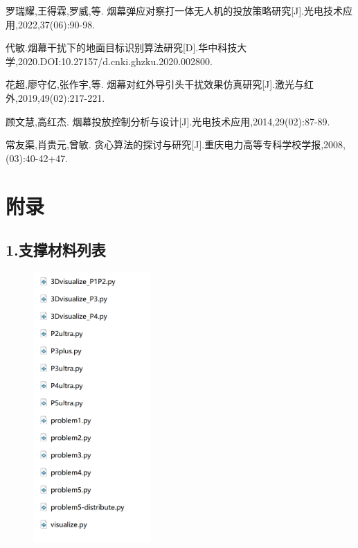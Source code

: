 \documentclass[12pt]{article}
\begin{document}
\begin{CJK}{UTF8}{gbsn}
		
		
		\newpage
		
		
		\begin{thebibliography}{99}
			

			 罗瑞耀,王得霖,罗威,等. 烟幕弹应对察打一体无人机的投放策略研究[J].光电技术应用,2022,37(06):90-98.
			
			 代敏.烟幕干扰下的地面目标识别算法研究[D].华中科技大学,2020.DOI:10.27157/d.cnki.ghzku.2020.002800.
			
			花超,廖守亿,张作宇,等. 烟幕对红外导引头干扰效果仿真研究[J].激光与红外,2019,49(02):217-221.

			顾文慧,高红杰. 烟幕投放控制分析与设计[J].光电技术应用,2014,29(02):87-89.
			
			常友渠,肖贵元,曾敏. 贪心算法的探讨与研究[J].重庆电力高等专科学校学报,2008,(03):40-42+47.
			
		\end{thebibliography}
		
		\clearpage
		
		\setcounter{page}{1} %
		
		
		\section*{附录}
		
		\subsection*{1.支撑材料列表}
		
		\begin{figure}[H]
			\includegraphics[width=0.4\textwidth]{pic/zhicheng.png}
		\end{figure}		
		

\end{CJK}
\end{document}
